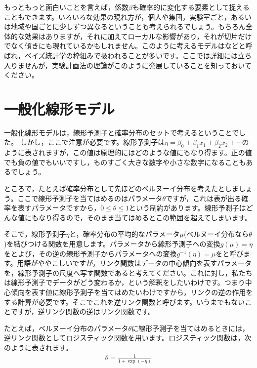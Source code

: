 \documentclass{ltjbook}
\begin{document}
もっともっと面白いことを言えば，係数$\beta$も確率的に変化する要素として捉えることもできます。いろいろな効果の現れ方が，個人や集団，実験室ごと，あるいは地域や国ごとに少しずつ異なるということも考えられるでしょう。もちろん全体的な効果はありますが，それに加えてローカルな影響があり，それが切片だけでなく傾きにも現れているかもしれません。このように考えるモデルはなどと呼ばれ，ベイズ統計学の枠組みで扱われることが多いです。ここでは詳細には立ち入りませんが，実験計画法の理論がこのように発展していることを知っておいてください。


\section{一般化線形モデル}
一般化線形モデルは，線形予測子と確率分布のセットで考えるということでした。
しかし，ここで注意が必要です。線形予測子は$\eta = \beta_0 + \beta_1 x_1 + \beta_2 x_2 + \cdots$のように表されますが，この値は原理的にはどのような値にもなり得ます。正の値でも負の値でもいいですし，ものすごく大きな数字や小さな数字になることもあるでしょう。

ところで，たとえば確率分布として先ほどのベルヌーイ分布を考えたとしましょう。ここで線形予測子を当てはめるのはパラメータ$\theta$ですが，これは表が出る確率を表すパラメータですから，$0 \leq \theta \leq 1$という制約があります。線形予測子はどんな値にもなり得るので，そのまま当てはめるとこの範囲を超えてしまいます。

そこで，線形予測子$\eta$と，確率分布の平均的なパラメータ$\mu$(ベルヌーイ分布なら$\theta$)を結びつける関数を用意します。パラメータから線形予測子への変換$g(\mu) = \eta$をとよび，その逆の線形予測子からパラメータへの変換$g^{-1}(\eta) = \mu$をと呼びます。用語がややこしいですが，リンク関数はデータの中心傾向を表すパラメータを，線形予測子の尺度へ写す関数であると考えてください。これに対し，私たちは線形予測子でデータがどう変わるか，という解釈をしたいわけです。つまり中心傾向を表す値に線形予測子を当てはめたいわけですから，リンクの逆の作用をする計算が必要です。そこでこれを逆リンク関数と呼びます。いうまでもないことですが，逆リンク関数の逆はリンク関数です。

たとえば，ベルヌーイ分布のパラメータ$\theta$に線形予測子を当てはめるときには，逆リンク関数としてロジスティック関数を用います。ロジスティック関数は，次のように表されます。
\begin{align}
\theta = \frac{1}{1 + \exp(-\eta)}
\end{align}
\end{document}
